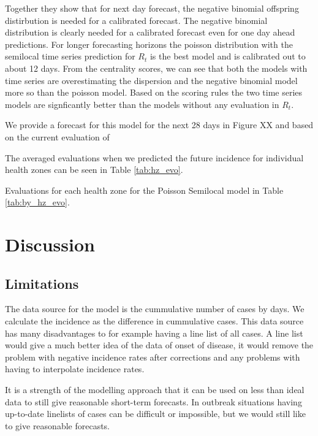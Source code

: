 \documentclass[12pt]{article}
\begin{document}
Together they show that for next day forecast, the negative binomial offspring distirbution is needed for a calibrated forecast. The negative binomial distribution is clearly needed for a calibrated forecast even for one day ahead predictions. For longer forecasting horizons the poisson distribution with the semilocal time series prediction for $R_t$ is the best model and is calibrated out to about 12 days. From the centrality scores, we can see that both the models with time series are overestimating the dispersion and the negative binomial model more so than the poisson model. Based on the scoring rules the two time series models are signficantly better than the models without any evaluation in $R_t$.

We provide a forecast for this model for the next 28 days in Figure XX and based on the current evaluation of 

The averaged evaluations when we predicted the future incidence for individual health zones can be seen in Table \ref{tab:hz_evo}.


Evaluations for each health zone for the Poisson Semilocal model in Table \ref{tab:by_hz_evo}.



\section{Discussion}


\subsection{Limitations}
The data source for the model is the cummulative number of cases by days. We calculate the incidence as the difference in cummulative cases. This data source has many disadvantages to for example having a line list of all cases. A line list would give a much better idea of the data of onset of disease, it would remove the problem with negative incidence rates after corrections and any problems with having to interpolate incidence rates.

It is a strength of the modelling approach that it can be used on less than ideal data to still give reasonable short-term forecasts. In outbreak situations having up-to-date linelists of cases can be difficult or impossible, but we would still like to give reasonable forecasts. 
\end{document}
